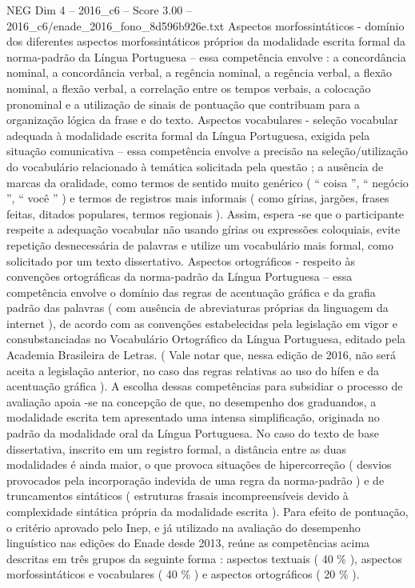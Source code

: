 \begin{textsample}{NEG Dim 4 – 2016\_c6 – Score 3.00 – 2016\_c6/enade\_2016\_fono\_8d596b926e.txt}
Aspectos morfossintáticos - domínio dos diferentes aspectos morfossintáticos próprios da modalidade escrita formal da norma-padrão da Língua Portuguesa – essa competência envolve : a concordância nominal, a concordância verbal, a regência nominal, a regência verbal, a flexão nominal, a flexão verbal, a correlação entre os tempos verbais, a colocação pronominal e a utilização de sinais de pontuação que contribuam para a organização lógica da frase e do texto.
Aspectos vocabulares - seleção vocabular adequada à modalidade escrita formal da Língua Portuguesa, exigida pela situação comunicativa – essa competência envolve a precisão na seleção/utilização do vocabulário relacionado à temática solicitada pela questão ; a ausência de marcas da oralidade, como termos de sentido muito genérico ( “ coisa ”, “ negócio ”, “ você ” ) e termos de registros mais informais ( como gírias, jargões, frases feitas, ditados populares, termos regionais ).
Assim, espera -se que o participante respeite a adequação vocabular não usando gírias ou expressões coloquiais, evite repetição desnecessária de palavras e utilize um vocabulário mais formal, como solicitado por um texto dissertativo.
Aspectos ortográficos - respeito às convenções ortográficas da norma-padrão da Língua Portuguesa – essa competência envolve o domínio das regras de acentuação gráfica e da grafia padrão das palavras ( com ausência de abreviaturas próprias da linguagem da internet ), de acordo com as convenções estabelecidas pela legislação em vigor e consubstanciadas no Vocabulário Ortográfico da Língua Portuguesa, editado pela Academia Brasileira de Letras. ( Vale notar que, nessa edição de 2016, não será aceita a legislação anterior, no caso das regras relativas ao uso do hífen e da acentuação gráfica ).
A escolha dessas competências para subsidiar o processo de avaliação apoia -se na concepção de que, no desempenho dos graduandos, a modalidade escrita tem apresentado uma intensa simplificação, originada no padrão da modalidade oral da Língua Portuguesa.
No caso do texto de base dissertativa, inscrito em um registro formal, a distância entre as duas modalidades é ainda maior, o que provoca situações de hipercorreção ( desvios provocados pela incorporação indevida de uma regra da norma-padrão ) e de truncamentos sintáticos ( estruturas frasais incompreensíveis devido à complexidade sintática própria da modalidade escrita ).
Para efeito de pontuação, o critério aprovado pelo Inep, e já utilizado na avaliação do desempenho linguístico nas edições do Enade desde 2013, reúne as competências acima descritas em três grupos da seguinte forma : aspectos textuais ( 40 \% ), aspectos morfossintáticos e vocabulares ( 40 \% ) e aspectos ortográficos ( 20 \% ).

\end{textsample}
